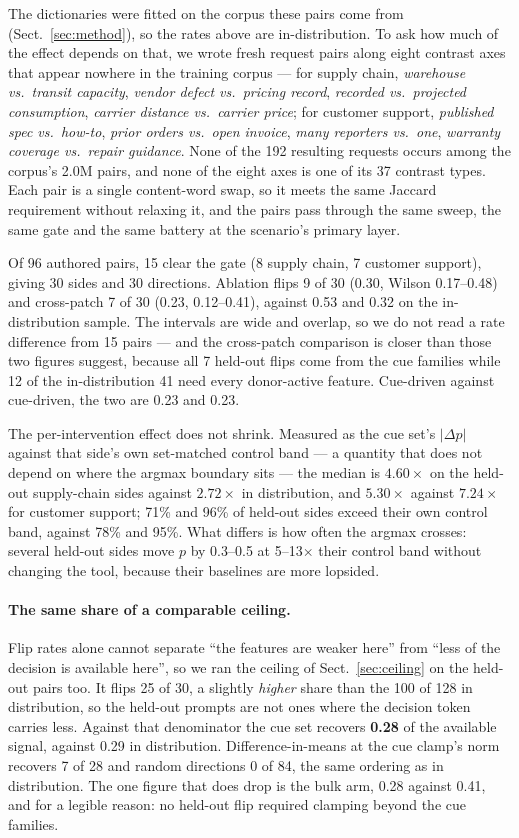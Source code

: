 \documentclass{article}
\begin{document}
The dictionaries were fitted on the corpus these pairs come from (Sect.~\ref{sec:method}), so the rates above are in-distribution. To ask how much of the effect depends on that, we wrote fresh request pairs along eight contrast axes that appear nowhere in the training corpus --- for supply chain, \emph{warehouse vs.\ transit capacity}, \emph{vendor defect vs.\ pricing record}, \emph{recorded vs.\ projected consumption}, \emph{carrier distance vs.\ carrier price}; for customer support, \emph{published spec vs.\ how-to}, \emph{prior orders vs.\ open invoice}, \emph{many reporters vs.\ one}, \emph{warranty coverage vs.\ repair guidance}. None of the 192 resulting requests occurs among the corpus's 2.0M pairs, and none of the eight axes is one of its 37 contrast types. Each pair is a single content-word swap, so it meets the same Jaccard requirement without relaxing it, and the pairs pass through the same sweep, the same gate and the same battery at the scenario's primary layer.

Of 96 authored pairs, 15 clear the gate (8 supply chain, 7 customer support), giving 30 sides and 30 directions. Ablation flips 9 of 30 (0.30, Wilson 0.17--0.48) and cross-patch 7 of 30 (0.23, 0.12--0.41), against 0.53 and 0.32 on the in-distribution sample. The intervals are wide and overlap, so we do not read a rate difference from 15 pairs --- and the cross-patch comparison is closer than those two figures suggest, because all 7 held-out flips come from the cue families while 12 of the in-distribution 41 need every donor-active feature. Cue-driven against cue-driven, the two are 0.23 and 0.23.

The per-intervention effect does not shrink. Measured as the cue set's $|\Delta p|$ against that side's own set-matched control band --- a quantity that does not depend on where the argmax boundary sits --- the median is $4.60\times$ on the held-out supply-chain sides against $2.72\times$ in distribution, and $5.30\times$ against $7.24\times$ for customer support; 71\% and 96\% of held-out sides exceed their own control band, against 78\% and 95\%. What differs is how often the argmax crosses: several held-out sides move $p$ by 0.3--0.5 at 5--13$\times$ their control band without changing the tool, because their baselines are more lopsided.

\paragraph{The same share of a comparable ceiling.} Flip rates alone cannot separate ``the features are weaker here'' from ``less of the decision is available here'', so we ran the ceiling of Sect.~\ref{sec:ceiling} on the held-out pairs too. It flips 25 of 30, a slightly \emph{higher} share than the 100 of 128 in distribution, so the held-out prompts are not ones where the decision token carries less. Against that denominator the cue set recovers \textbf{0.28} of the available signal, against 0.29 in distribution. Difference-in-means at the cue clamp's norm recovers 7 of 28 and random directions 0 of 84, the same ordering as in distribution. The one figure that does drop is the bulk arm, 0.28 against 0.41, and for a legible reason: no held-out flip required clamping beyond the cue families.
\end{document}
